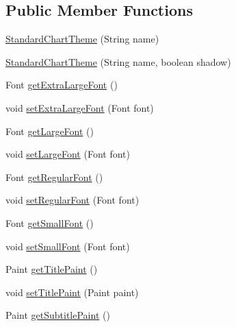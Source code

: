 \subsection*{Public Member Functions}
\begin{DoxyCompactItemize}
\item 
\mbox{\hyperlink{classorg_1_1jfree_1_1chart_1_1_standard_chart_theme_ac7cf45b617ae438b35cfeb4bfda6268a}{Standard\+Chart\+Theme}} (String name)
\item 
\mbox{\hyperlink{classorg_1_1jfree_1_1chart_1_1_standard_chart_theme_af4ac6d4bcb4adde6cfca75b899177aaf}{Standard\+Chart\+Theme}} (String name, boolean shadow)
\item 
Font \mbox{\hyperlink{classorg_1_1jfree_1_1chart_1_1_standard_chart_theme_acf811e55b1bbf7d66303013514a9c500}{get\+Extra\+Large\+Font}} ()
\item 
void \mbox{\hyperlink{classorg_1_1jfree_1_1chart_1_1_standard_chart_theme_adccbed6b93551e77c4432d4952ffac12}{set\+Extra\+Large\+Font}} (Font font)
\item 
Font \mbox{\hyperlink{classorg_1_1jfree_1_1chart_1_1_standard_chart_theme_a55c6caf1eb9cfc15990f39b9bf69573d}{get\+Large\+Font}} ()
\item 
void \mbox{\hyperlink{classorg_1_1jfree_1_1chart_1_1_standard_chart_theme_ab425d53672731d2bc1918d8916c299d7}{set\+Large\+Font}} (Font font)
\item 
Font \mbox{\hyperlink{classorg_1_1jfree_1_1chart_1_1_standard_chart_theme_a588cc2cf8dff888884e79ed24adafeba}{get\+Regular\+Font}} ()
\item 
void \mbox{\hyperlink{classorg_1_1jfree_1_1chart_1_1_standard_chart_theme_ae3327471f36e9858487df4e1ef36d9e3}{set\+Regular\+Font}} (Font font)
\item 
Font \mbox{\hyperlink{classorg_1_1jfree_1_1chart_1_1_standard_chart_theme_a118c992e7711e55b0e878892ff7e73e9}{get\+Small\+Font}} ()
\item 
void \mbox{\hyperlink{classorg_1_1jfree_1_1chart_1_1_standard_chart_theme_a2ccfadc13b45218fac64a11c83adf070}{set\+Small\+Font}} (Font font)
\item 
Paint \mbox{\hyperlink{classorg_1_1jfree_1_1chart_1_1_standard_chart_theme_adf952b6f9c7dcb070504b6adb17fa459}{get\+Title\+Paint}} ()
\item 
void \mbox{\hyperlink{classorg_1_1jfree_1_1chart_1_1_standard_chart_theme_a341d5ca7e783e7db475b0e0d9508ff42}{set\+Title\+Paint}} (Paint paint)
\item 
Paint \mbox{\hyperlink{classorg_1_1jfree_1_1chart_1_1_standard_chart_theme_ada6593c77d8f7fb0dd9bf3c3f9fffd79}{get\+Subtitle\+Paint}} ()

\end{DoxyCompactItemize}

